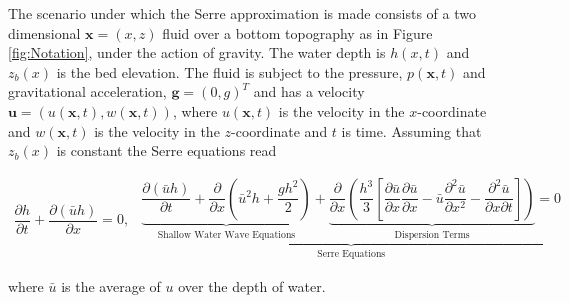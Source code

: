 \documentclass[SingleSpace,12pt]{Serre_ASCE}
\begin{document}
The scenario under which the Serre approximation is made consists of a two dimensional $\textbf{x} = (x,z)$ fluid over a bottom topography as in Figure \ref{fig:Notation}, under the action of gravity. The water depth is $h(x,t)$ and $z_b(x)$ is the bed elevation. The fluid is subject to the pressure, $p(\textbf{x},t)$ and  gravitational acceleration, $\textbf{g} = (0,g)^T$ and has a velocity $\textbf{u} = (u(\textbf{x},t),w(\textbf{x},t))$,  where $u(\textbf{x},t)$ is the velocity in the $x$-coordinate and $w(\textbf{x},t)$ is the velocity in the $z$-coordinate and $t$ is time. Assuming that $z_b(x)$ is constant the Serre equations read \cite{Guyenne-etal-2014-169,Zoppou-2014}
\begin{linenomath*}
\begin{subequations}\label{eq:Serre_conservative_form}
\begin{gather}
\dfrac{\partial h}{\partial t} + \dfrac{\partial (\bar{u}h)}{\partial x} = 0,
\label{eq:Serre_continuity}
\end{gather}
\begin{gather}
\underbrace{\underbrace{\dfrac{\partial (\bar{u}h)}{\partial t} + \dfrac{\partial}{\partial x} \left ( \bar{u}^2h + \dfrac{gh^2}{2}\right )}_{\text{Shallow Water Wave Equations}} + \underbrace{\dfrac{\partial}{\partial x} \left (  \dfrac{h^3}{3} \left [ \dfrac{\partial \bar{u} }{\partial x} \dfrac{\partial \bar{u}}{\partial x} - \bar{u} \dfrac{\partial^2 \bar{u}}{\partial x^2}  - \dfrac{\partial^2 \bar{u}}{\partial x \partial t}\right ] \right )}_{\text{Dispersion Terms}} = 0}_{\text{Serre Equations}}
\label{eq:Serre_momentum}
\end{gather}
\end{subequations}
\end{linenomath*}
where $\bar{u}$ is the average of $u$ over the depth of water.
\end{document}
